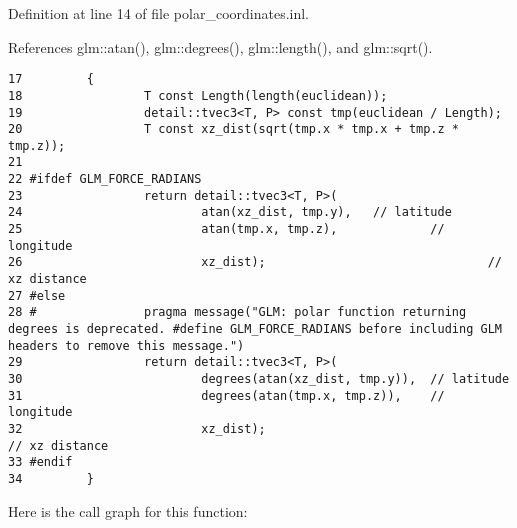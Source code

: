 Definition at line 14 of file polar\_\-coordinates.inl.

References glm::atan(), glm::degrees(), glm::length(), and glm::sqrt().

\begin{Code}\begin{verbatim}17         {
18                 T const Length(length(euclidean));
19                 detail::tvec3<T, P> const tmp(euclidean / Length);
20                 T const xz_dist(sqrt(tmp.x * tmp.x + tmp.z * tmp.z));
21 
22 #ifdef GLM_FORCE_RADIANS
23                 return detail::tvec3<T, P>(
24                         atan(xz_dist, tmp.y),   // latitude
25                         atan(tmp.x, tmp.z),             // longitude
26                         xz_dist);                               // xz distance
27 #else
28 #               pragma message("GLM: polar function returning degrees is deprecated. #define GLM_FORCE_RADIANS before including GLM headers to remove this message.")
29                 return detail::tvec3<T, P>(
30                         degrees(atan(xz_dist, tmp.y)),  // latitude
31                         degrees(atan(tmp.x, tmp.z)),    // longitude
32                         xz_dist);                                               // xz distance
33 #endif
34         }
\end{verbatim}
\end{Code}




Here is the call graph for this function: